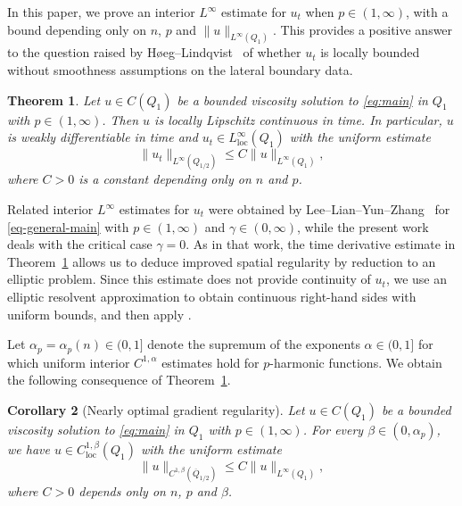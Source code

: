 \documentclass[a4paper,11pt]{amsart}
\theoremstyle{plain}
\newtheorem{theorem}{Theorem}[section]
\newtheorem{corollary}[theorem]{Corollary}
\theoremstyle{definition}
\numberwithin{equation}{section}
\begin{document}
In this paper, we prove an interior $L^\infty$ estimate for $u_t$ when $p\in(1,\infty)$, with a bound depending only on $n$, $p$ and $\|u\|_{L^\infty(Q_1)}$. This provides a positive answer to the question raised by H{\o}eg--Lindqvist~\cite{HL20} of whether $u_t$ is locally bounded without smoothness assumptions on the lateral boundary data.

\begin{theorem}\label{thm:main}
Let $u\in C(Q_1)$ be a bounded viscosity solution to \eqref{eq:main} in $Q_1$ with $p\in(1,\infty)$. Then $u$ is locally Lipschitz continuous in time. In particular, $u$ is weakly differentiable in time and $u_t\in L^\infty_{\mathrm{loc}}(Q_1)$ with the uniform estimate
\begin{equation*}
 \|u_t\|_{L^\infty(Q_{1/2})}\leq C\|u\|_{L^\infty(Q_1)},
\end{equation*}
where $C>0$ is a constant depending only on $n$ and $p$.
\end{theorem}

Related interior $L^\infty$ estimates for $u_t$ were obtained by Lee--Lian--Yun--Zhang~\cite{LLYZ25} for \eqref{eq-general-main} with $p\in(1,\infty)$ and $\gamma \in (0, \infty)$, while the present work deals with the critical case $\gamma=0$. As in that work, the time derivative estimate in Theorem~\ref{thm:main} allows us to deduce improved spatial regularity by reduction to an elliptic problem. Since this estimate does not provide continuity of $u_t$, we use an elliptic resolvent approximation to obtain continuous right-hand sides with uniform bounds, and then apply \cite[Theorem~1.3]{APR17}.

Let $\alpha_p=\alpha_p(n)\in(0,1]$ denote the supremum of the exponents $\alpha\in(0,1]$ for which uniform interior $C^{1,\alpha}$ estimates hold for $p$-harmonic functions.
We obtain the following consequence of Theorem~\ref{thm:main}.

\begin{corollary}[Nearly optimal gradient regularity]\label{cor:almost-optimal-gradient}
Let $u\in C(Q_1)$ be a bounded viscosity solution to \eqref{eq:main} in $Q_1$ with $p\in(1,\infty)$. For every $\beta\in(0,\alpha_p)$, we have $u \in C^{1,\beta}_{\mathrm{loc}}({Q}_{1})$ with the uniform estimate
\begin{equation*}
\|u\|_{C^{1,\beta}(\overline{Q}_{1/2})} \leq C\|u\|_{L^\infty(Q_1)},
\end{equation*}
where $C>0$ depends only on $n$, $p$ and $\beta$. 
\end{corollary}
\end{document}
